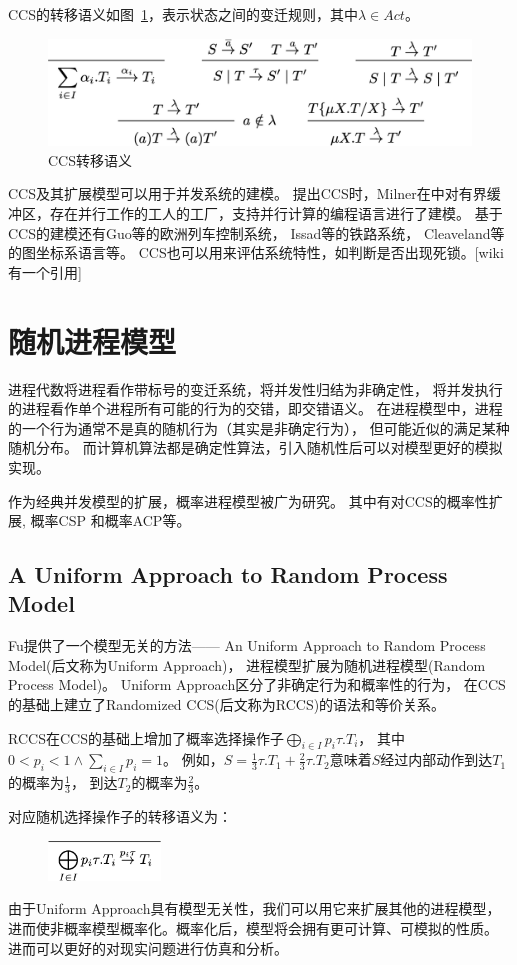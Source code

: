    CCS的转移语义如图~\ref{fig_ccs}，表示状态之间的变迁规则，其中$\lambda \in Act$。

   \begin{figure}[!htbp]
    \small
    \centering
    \includegraphics[width=13cm]{../figure/ccs.png}
    \caption[]{CCS转移语义}
     \label{fig_ccs}
 \end{figure}

   CCS及其扩展模型可以用于并发系统的建模。
   提出CCS时，Milner在\cite{2}中对有界缓冲区，存在并行工作的工人的工厂，支持并行计算的编程语言进行了建模。
   基于CCS的建模还有Guo等的欧洲列车控制系统\cite{16}，
   Issad等的铁路系统\cite{17}，
   Cleaveland等的图坐标系语言\cite{18}等。
   CCS也可以用来评估系统特性，如判断是否出现死锁。[wiki有一个引用]
   \section{随机进程模型}

   进程代数将进程看作带标号的变迁系统，将并发性归结为非确定性，
   将并发执行的进程看作单个进程所有可能的行为的交错，即交错语义。
   在进程模型中，进程的一个行为通常不是真的随机行为（其实是非确定行为），
   但可能近似的满足某种随机分布。
   而计算机算法都是确定性算法，引入随机性后可以对模型更好的模拟实现。

   作为经典并发模型的扩展，概率进程模型被广为研究。
   其中有对CCS的概率性扩展\cite{9,10},
   概率CSP\cite{11} 和概率ACP\cite{12}等。

   \subsection{A Uniform Approach to Random Process Model}
   Fu提供了一个模型无关的方法—— An Uniform Approach to Random Process Model(后文称为Uniform Approach)，
   进程模型扩展为随机进程模型(Random Process Model)。
   Uniform Approach区分了非确定行为和概率性的行为，
   在CCS的基础上建立了Randomized CCS(后文称为RCCS)的语法和等价关系。

   RCCS在CCS的基础上增加了概率选择操作子$\bigoplus_{i\in I}p_i\tau.T_i$，
   其中$0<p_i<1 \wedge \sum_{i\in I}p_i = 1$。
   例如，$S=\frac{1}{3}\tau.T_1+\frac{2}{3}\tau.T_2$意味着$S$经过内部动作到达$T_1$的概率为$\frac{1}{3}$，
   到达$T_2$的概率为$\frac{2}{3}$。

   对应随机选择操作子的转移语义为：
   \begin{figure}[!htbp]
    \small
    \centering
    \includegraphics[width=3cm]{../figure/rccs.png}
     \label{fig_rccs}
 \end{figure}

   由于Uniform Approach具有模型无关性，我们可以用它来扩展其他的进程模型，
   进而使非概率模型概率化。概率化后，模型将会拥有更可计算、可模拟的性质。
   进而可以更好的对现实问题进行仿真和分析。
